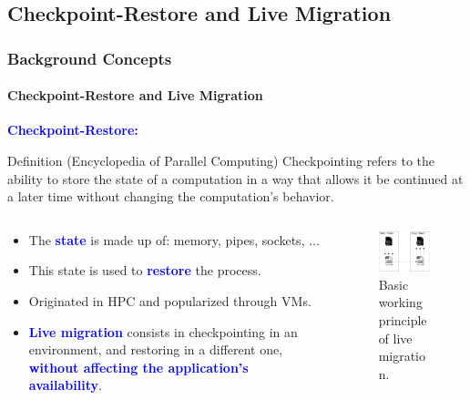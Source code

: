 \documentclass[9pt,    %
    english,            %
    xcolor=table,       %
    envcountsect,        %
    aspectratio=169     %
]{beamer}
\begin{document}
\subsection{Checkpoint-Restore and Live Migration}

\begin{frame}
    \frametitle{Background Concepts}
    \framesubtitle{Checkpoint-Restore and Live Migration}

    \textcolor{blue}{\textbf{Checkpoint-Restore:}}
    \begin{alertblock}{Definition (Encyclopedia of Parallel Computing)}
        Checkpointing refers to the ability to store the state of a computation in a way that allows it be continued at a later time without changing the computation's behavior.
    \end{alertblock}

    \vspace{-10pt}
    \begin{columns}[t]
        \begin{column}{.65\textwidth}
            \begin{itemize}
                \item The \textbf{\textcolor{blue}{state}} is made up of: memory, pipes, sockets, ...
                \item This state is used to \textbf{\textcolor{blue}{restore}} the process.
                \item Originated in HPC and popularized through VMs.
                \item \textbf{\textcolor{blue}{Live migration}} consists in checkpointing in an environment, and restoring in a different one, \textcolor{blue}{\textbf{without affecting the application's availability}}.
            \end{itemize}
        \end{column}\hfill
        \begin{column}{.35\textwidth}
            \begin{figure}
                \centering
                \includegraphics[width=.7\textwidth]{./images/cr.png}
                \caption{Basic working principle of live migration.}
            \end{figure}
        \end{column}
    \end{columns}

\end{frame}
\end{document}
